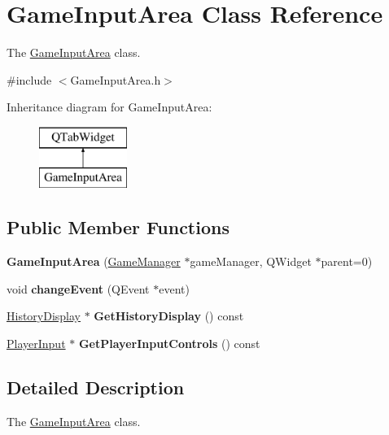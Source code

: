 \hypertarget{classGameInputArea}{\section{Game\-Input\-Area Class Reference}
\label{classGameInputArea}
}


The \hyperlink{classGameInputArea}{Game\-Input\-Area} class.  




{\ttfamily \#include $<$Game\-Input\-Area.\-h$>$}

Inheritance diagram for Game\-Input\-Area\-:\begin{figure}[H]
\begin{center}
\leavevmode
\includegraphics[height=2.000000cm]{classGameInputArea}
\end{center}
\end{figure}
\subsection*{Public Member Functions}
\begin{DoxyCompactItemize}
\item 
\hypertarget{classGameInputArea_a37bb000732d3b5e4f98923d4a753991e}{{\bfseries Game\-Input\-Area} (\hyperlink{classGameManager}{Game\-Manager} $\ast$game\-Manager, Q\-Widget $\ast$parent=0)}\label{classGameInputArea_a37bb000732d3b5e4f98923d4a753991e}

\item 
\hypertarget{classGameInputArea_aeda3377d2dd4b04fe530ef96b52162ea}{void {\bfseries change\-Event} (Q\-Event $\ast$event)}\label{classGameInputArea_aeda3377d2dd4b04fe530ef96b52162ea}

\item 
\hypertarget{classGameInputArea_a490df7daa012d358294f715bdb6addf6}{\hyperlink{classHistoryDisplay}{History\-Display} $\ast$ {\bfseries Get\-History\-Display} () const }\label{classGameInputArea_a490df7daa012d358294f715bdb6addf6}

\item 
\hypertarget{classGameInputArea_ad68c49dd0996e9661d84cd778ebcb4ef}{\hyperlink{classPlayerInput}{Player\-Input} $\ast$ {\bfseries Get\-Player\-Input\-Controls} () const }\label{classGameInputArea_ad68c49dd0996e9661d84cd778ebcb4ef}

\end{DoxyCompactItemize}


\subsection{Detailed Description}
The \hyperlink{classGameInputArea}{Game\-Input\-Area} class. 